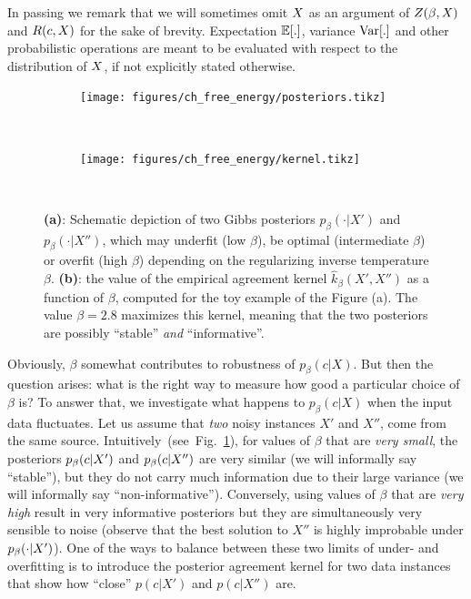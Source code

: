 In passing we remark that we will sometimes omit $X$ as
an argument of $Z(\beta, X)$ and $R(c, X)$ for the sake of brevity. 
Expectation $\mathbb{E}[.]$,
variance ${\mathrm{Var}}[.]$ and other probabilistic operations are meant to be evaluated with
respect to the distribution of $X$, if not explicitly stated otherwise.


\begin{figure}[ht!]
\centering
\begin{subfigure}[b]{\linewidth}
  \noindent\texttt{[image: figures/ch\_free\_energy/posteriors.tikz]}%
  \caption{}
  \label{fig:two-instance}
\end{subfigure}
\\[.5cm]
\begin{subfigure}[b]{\linewidth}
  \noindent\texttt{[image: figures/ch\_free\_energy/kernel.tikz]}%
  \caption{}
  \label{fig:two-instance-capacity}
\end{subfigure}
\\[.5cm]
\caption{\textbf{(a)}: Schematic depiction of two Gibbs posteriors $p_\beta(\cdot|X')$
  and $p_\beta(\cdot|X'')$, which may underfit (low $\beta$), be optimal
  (intermediate $\beta$) or overfit (high $\beta$) depending on the regularizing
  inverse temperature $\beta$. \textbf{(b)}: the value of the empirical agreement
  kernel $\hat{k}_\beta(X',X'')$ as a function of $\beta$, computed for the toy
  example of the Figure (a). The value $\beta=2.8$ maximizes this kernel,
  meaning that the two posteriors are possibly ``stable'' \emph{and}
  ``informative''.}
\end{figure}%

Obviously, $\beta$ somewhat contributes to robustness of $p_\beta(c|X)$. But
then the question arises: what is the right way to measure how good a particular
choice of $\beta$ is? To answer that, we investigate what happens to $p_\beta(c|X)$
when the input data fluctuates. Let us assume that
\textit{two} noisy instances $X'$ and $X''$, come from the same source. 
Intuitively~(see~Fig.~\ref{fig:two-instance}), for values of $\beta$ that are
\textit{very small}, the posteriors $p_\beta(c | X')$ and $p_\beta(c |
X'')$ are very similar (we will informally say ``stable''), but they do not carry much information
due to their large variance (we will informally say ``non-informative'').
Conversely, using values of $\beta$ that are \textit{very high} result in very informative posteriors but they are
simultaneously very sensible to noise (observe that the best solution to $X''$
is highly improbable under $p_\beta(\cdot|X')$). One of the ways to balance
between these two limits of under- and overfitting is to introduce the posterior
agreement kernel for two data instances that show how ``close'' $p(c|X')$ 
and $p(c|X'')$ are.
%

